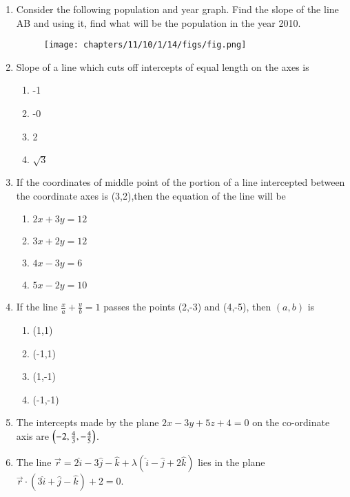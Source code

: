 \begin{enumerate}[label=\thesubsection.\arabic*,ref=\thesubsection.\theenumi]
\item Consider the following population and year graph. Find the slope of the line AB and using it, find what will be the population in the year 2010.
\\
\begin{figure}[H]
\centering
\texttt{[image: chapters/11/10/1/14/figs/fig.png]}
\caption{}
\label{fig:chapters/11/10/1/14/1}
\end{figure}
\solution

\item Slope of a line which cuts off intercepts of equal length on the axes is 
\begin{enumerate}
\item -1
\item -0
\item 2
\item $\sqrt{3}$
\end{enumerate}
\item If the coordinates of middle point of the portion of a line intercepted between the coordinate axes is (3,2),then the equation of the line will be
\begin{enumerate}
\item $2x+3y=12$
\item $3x+2y=12$
\item $4x-3y=6$
\item $5x-2y=10$
\end{enumerate}
\item If the line $\frac{x}{a}+\frac{y}{b}=1$ passes the points (2,-3) and (4,-5), then $(a,b)$ is 
\begin{enumerate}
\item (1,1)
\item (-1,1)
\item (1,-1)
\item (-1,-1)
\end{enumerate}
\item The intercepts made by the plane $2x-3y+5z+4=0$ on the co-ordinate axis are $\left(-2,\frac{4}{3},-\frac{4}{5}\right)$.
\item The line $\overrightarrow{r}=2\hat{i}-3\hat{j}-\hat{k}+\lambda(\hat{i}-\hat{j}+2\hat{k})$ lies in the plane $\overrightarrow{r} \cdot (3\hat{i}+\hat{j}-\hat{k})+2=0$.
\end{enumerate}
